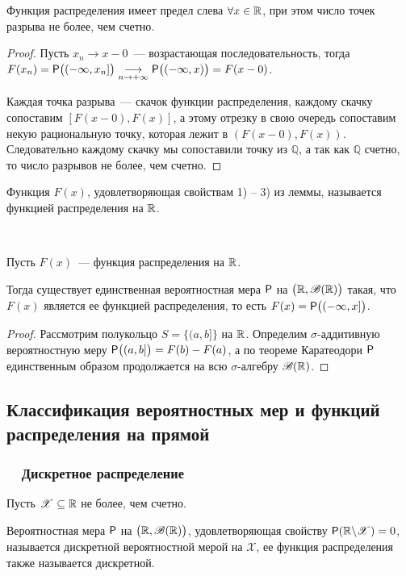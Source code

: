 \begin{property}
	Функция распределения имеет предел слева $\forall x \in \R$, при этом число точек разрыва не более, чем счетно.
	\begin{proof}
		Пусть $x_n \rightarrow x - 0$~--- возрастающая последовательность, тогда $F(x_n) = \P \big( (-\infty, x_n] \big) \underset{n \rightarrow +\infty}{\longrightarrow} \P \big( (-\infty, x) \big) = F(x - 0)$. 
		
		Каждая точка разрыва~--- скачок функции распределения, каждому скачку сопоставим $[F(x-0), F(x)]$, а этому отрезку в свою очередь сопоставим некую рациональную точку, которая лежит в $(F(x-0), F(x))$. Следовательно каждому скачку мы сопоставили точку из $\mathbb{Q}$, а так как $\mathbb{Q}$ счетно, то число разрывов не более, чем счетно.
	\end{proof}
\end{property}

\begin{definition}
	Функция $F(x)$, удовлетворяющая свойствам 1) -- 3) из леммы, называется функцией распределения на $\R$.
\end{definition}

\begin{theorem}~

	Пусть $F(x)$~--- функция распределения на $\R$.
	
	Тогда существует единственная вероятностная мера $\P$ на $\big(\R, \B(\R) \big)$ такая, что $F(x)$ является ее функцией распределения, то есть $F(x) = \P \big( ( -\infty, x] \big)$.
	\begin{proof}
		Рассмотрим полукольцо $ S = \big\{ (a, b] \big\}$ на $\R$. Определим $\sigma$-аддитивную вероятностную меру $\P \big( (a, b] \big) = F(b) - F(a)$, а по теореме Каратеодори $\P$ единственным образом продолжается на всю $\sigma$-алгебру $\B(\R)$.
	\end{proof}
\end{theorem}

\subsection{Классификация вероятностных мер и функций распределения на прямой}
\subsubsection*{~~Дискретное распределение}
Пусть $\mathscr{X} \subseteq \R$ не более, чем счетно.
\begin{definition}
	Вероятностная мера $\P$ на $\big( \R, \B(\R) \big)$, удовлетворяющая свойству $\P(\R \backslash \mathscr{X}) = 0$, называется дискретной вероятностной мерой на $\mathscr{X}$, ее функция распределения также называется дискретной.
\end{definition}

